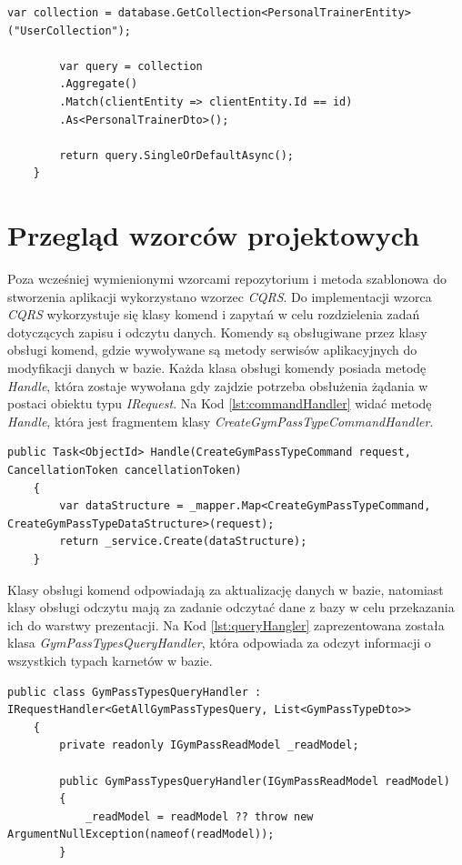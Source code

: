 \documentclass[a4paper,twoside,12pt]{book}
\begin{document}
{\begin{lstlisting}[caption={Metoda odczytu informacji o koncie trenera personalnego przy wykorzystaniu metod sterownika}, label={lst:personalTrainerReadModel}]
		var collection = database.GetCollection<PersonalTrainerEntity>("UserCollection");
		
		var query = collection
		.Aggregate()
		.Match(clientEntity => clientEntity.Id == id)
		.As<PersonalTrainerDto>();
		
		return query.SingleOrDefaultAsync();
	}
\end{lstlisting}

\section{Przegląd wzorców projektowych}
Poza wcześniej wymienionymi wzorcami repozytorium i metoda szablonowa do stworzenia aplikacji wykorzystano wzorzec \textit{CQRS}. Do implementacji wzorca \textit{CQRS} wykorzystuje się klasy komend i zapytań w celu rozdzielenia zadań dotyczących zapisu i odczytu danych. Komendy są obsługiwane przez klasy obsługi komend, gdzie wywoływane są metody serwisów aplikacyjnych do modyfikacji danych w bazie. Każda klasa obsługi komendy posiada metodę \textit{Handle}, która zostaje wywołana gdy zajdzie potrzeba obsłużenia żądania w postaci obiektu typu \textit{IRequest}. Na Kod \ref{lst:commandHandler} widać metodę \textit{Handle}, która jest fragmentem klasy \textit{CreateGymPassTypeCommandHandler}.
\begin{lstlisting}[caption={Metoda \textit{Handle} klasy \textit{CreateGymPassTypeCommandHandler}}, label={lst:commandHandler}]
	public Task<ObjectId> Handle(CreateGymPassTypeCommand request, CancellationToken cancellationToken)
	{
		var dataStructure = _mapper.Map<CreateGymPassTypeCommand, CreateGymPassTypeDataStructure>(request);
		return _service.Create(dataStructure);
	}
\end{lstlisting}
Klasy obsługi komend odpowiadają za aktualizację danych w bazie, natomiast klasy obsługi odczytu mają za zadanie odczytać dane z bazy w celu przekazania ich do warstwy prezentacji. Na Kod \ref{lst:queryHangler} zaprezentowana została klasa \textit{GymPassTypesQueryHandler}, która odpowiada za odczyt informacji o wszystkich typach karnetów w bazie.
\begin{lstlisting}[caption={Klasa \textit{GymPassTypesQueryHandler}}, label={lst:queryHangler}]
	public class GymPassTypesQueryHandler : IRequestHandler<GetAllGymPassTypesQuery, List<GymPassTypeDto>>
	{
		private readonly IGymPassReadModel _readModel;
		
		public GymPassTypesQueryHandler(IGymPassReadModel readModel)
		{
			_readModel = readModel ?? throw new ArgumentNullException(nameof(readModel));
		}
		

\end{lstlisting}}
\end{document}
